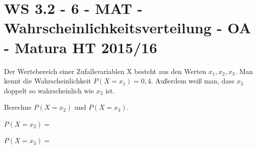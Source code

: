 \section{WS 3.2 - 6 - MAT - Wahrscheinlichkeitsverteilung - OA - Matura HT 2015/16}

\begin{beispiel}[WS 3.2]{1} %
Der Wertebereich einer Zufallsvariablen X besteht aus den Werten $x_1, x_2, x_3$.
Man kennt die Wahrscheinlichkeit $P(X = x_1) = 0,4$. Außerdem weiß man, dass $x_3$ doppelt so wahrscheinlich wie $x_2$ ist. \leer

Berechne $P(X=x_2)$ und $P(X=x_3)$. \leer

$P(X=x_2)=$\, \leer

$P(X=x_3)=$\, \leer
\end{beispiel}